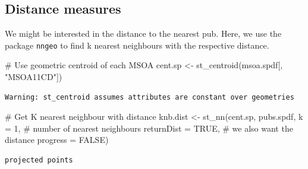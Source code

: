 \documentclass[
  letterpaper,
  DIV=11,
  numbers=noendperiod]{scrreprt}
\newenvironment{Shaded}{\begin{snugshade}}{\end{snugshade}}
\newcommand{\AttributeTok}[1]{\textcolor[rgb]{0.40,0.45,0.13}{#1}}
\newcommand{\CommentTok}[1]{\textcolor[rgb]{0.37,0.37,0.37}{#1}}
\newcommand{\ConstantTok}[1]{\textcolor[rgb]{0.56,0.35,0.01}{#1}}
\newcommand{\DecValTok}[1]{\textcolor[rgb]{0.68,0.00,0.00}{#1}}
\newcommand{\FunctionTok}[1]{\textcolor[rgb]{0.28,0.35,0.67}{#1}}
\newcommand{\NormalTok}[1]{\textcolor[rgb]{0.00,0.23,0.31}{#1}}
\newcommand{\OtherTok}[1]{\textcolor[rgb]{0.00,0.23,0.31}{#1}}
\newcommand{\SpecialCharTok}[1]{\textcolor[rgb]{0.37,0.37,0.37}{#1}}
\newcommand{\StringTok}[1]{\textcolor[rgb]{0.13,0.47,0.30}{#1}}
\begin{document}
\hypertarget{distance-measures}{%
\subsection{Distance measures}\label{distance-measures}}

We might be interested in the distance to the nearest pub. Here, we use
the package \texttt{nngeo} to find k nearest neighbours with the
respective distance.

\begin{Shaded}
\begin{Highlighting}[]
\CommentTok{\# Use geometric centroid of each MSOA}
\NormalTok{cent.sp }\OtherTok{\textless{}{-}} \FunctionTok{st\_centroid}\NormalTok{(msoa.spdf[, }\StringTok{"MSOA11CD"}\NormalTok{])}
\end{Highlighting}
\end{Shaded}

\begin{verbatim}
Warning: st_centroid assumes attributes are constant over geometries
\end{verbatim}

\begin{Shaded}
\begin{Highlighting}[]
\CommentTok{\# Get K nearest neighbour with distance}
\NormalTok{knb.dist }\OtherTok{\textless{}{-}} \FunctionTok{st\_nn}\NormalTok{(cent.sp, }
\NormalTok{                  pubs.spdf,}
                  \AttributeTok{k =} \DecValTok{1}\NormalTok{,             }\CommentTok{\# number of nearest neighbours}
                  \AttributeTok{returnDist =} \ConstantTok{TRUE}\NormalTok{, }\CommentTok{\# we also want the distance}
                  \AttributeTok{progress =} \ConstantTok{FALSE}\NormalTok{)}
\end{Highlighting}
\end{Shaded}

\begin{verbatim}
projected points
\end{verbatim}

\begin{Shaded}
\end{Shaded}
\end{document}
